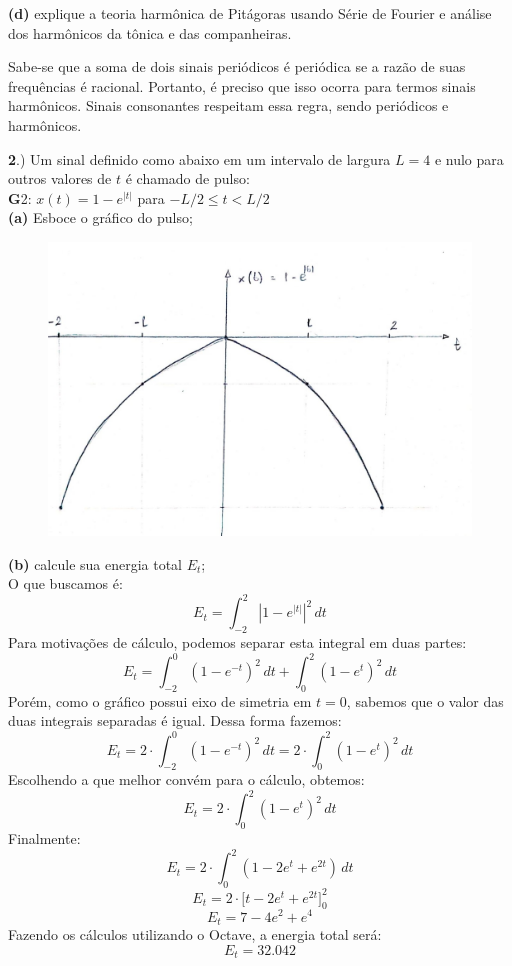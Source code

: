 \documentclass[10pt, a4paper]{article}
\begin{document}
\vspace{\baselineskip}

{\textbf{(d)}} explique a teoria harmônica de Pitágoras usando Série de Fourier e análise dos harmônicos da tônica e das companheiras.

Sabe-se que a soma de dois sinais periódicos é periódica se a razão de suas frequências é racional. Portanto, é preciso que isso ocorra para termos sinais harmônicos. Sinais consonantes respeitam essa regra, sendo periódicos e harmônicos.

\vspace{\baselineskip}
{\textbf 2.)} Um sinal definido como abaixo em um intervalo de largura $L = 4$ e nulo para outros valores de $t$ é chamado de pulso:\\
{\textbf G2:} $x(t) = 1 - e^{|t|}$ para $- L/2 \leq t < L/2$\\
{\textbf{(a)}} Esboce o gráfico do pulso;

\begin{figure}[h]
    \includegraphics[scale=0.3]{plot2a.jpeg}
    \centering
\end{figure}

{\textbf{(b)}} calcule sua energia total $E_{t}$;\\
O que buscamos é:
\[E_{t} = \int_{-2}^{2} |1 - e^{|t|}|^2\,dt\]
Para motivações de cálculo, podemos separar esta integral em duas partes:
\[E_{t} = \int_{-2}^{0} (1 - e^{-t})^{2}\,dt + \int_{0}^{2} (1 - e^{t})^{2}\,dt\]
Porém, como o gráfico possui eixo de simetria em $t = 0$, sabemos que o valor das duas integrais separadas é igual. Dessa forma fazemos:
\[E_{t} = 2 \cdot \int_{-2}^{0} (1 - e^{-t})^{2}\,dt = 2 \cdot \int_{0}^{2} (1 - e^{t})^{2}\,dt\]
Escolhendo a que melhor convém para o cálculo, obtemos:
\[E_{t} = 2 \cdot \int_{0}^{2} (1 - e^{t})^{2}\,dt\]
Finalmente:
\[E_{t} = 2 \cdot \int_{0}^{2} (1 - 2e^t + e^{2t})\,dt\]
\[E_{t} = 2 \cdot \bigl[t - 2e^t + e^{2t} \bigr]_{0}^{2}\]
\[E_{t} = 7 - 4e^2 + e^{4}\]
Fazendo os cálculos utilizando o Octave, a energia total será:
\[E_{t} = 32.042\]
\end{document}
